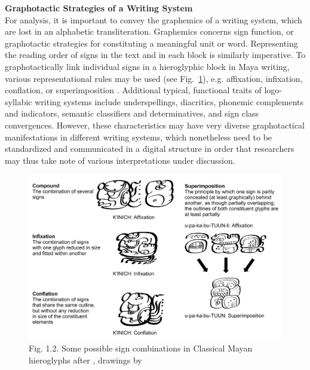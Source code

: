 \documentclass[amsthm,ebook]{saparticle}
\begin{document}
\vspace{0.5cm}
\noindent\textbf{Graphotactic Strategies of a Writing System}\\
For analysis, it is important to convey the graphemics of a writing system, which are lost in an alphabetic
transliteration. Graphemics concerns sign function, or graphotactic strategies for constituting a meaningful unit or
word. Representing the reading order of signs in the text and in each block is similarly imperative. To
graphotactically link individual signs in a hieroglyphic block in Maya writing, various representational rules may be
used (see Fig.~\ref{fig:2}), e.g. affixation, infixation, conflation, or superimposition \citep{Zender1999}. Additional typical,
functional traits of logo-syllabic writing systems include underspellings, diacritics, phonemic complements and
indicators, semantic classifiers and determinatives, and sign class convergences. However, these characteristics may
have very diverse graphotactical manifestations in different writing systems, which nonetheless need to be standardized
and communicated in a digital structure in order that researchers may thus take note of various interpretations under
discussion. 

\begin{figure}[!hbp]
\centering
 \includegraphics[width=\columnwidth]{EAGLE2016submission8revisedx-img002.png}
\caption[Some possible sign combinations in Classical Mayan hieroglyphs after \citet{Zender1999}, drawings by
\citet{Prager2015}]{Fig. 1.2. Some possible sign combinations in Classical Mayan hieroglyphs after \citet{Zender1999}, drawings by \citet{Prager2015}}
\label{fig:2}
\end{figure}
\end{document}
